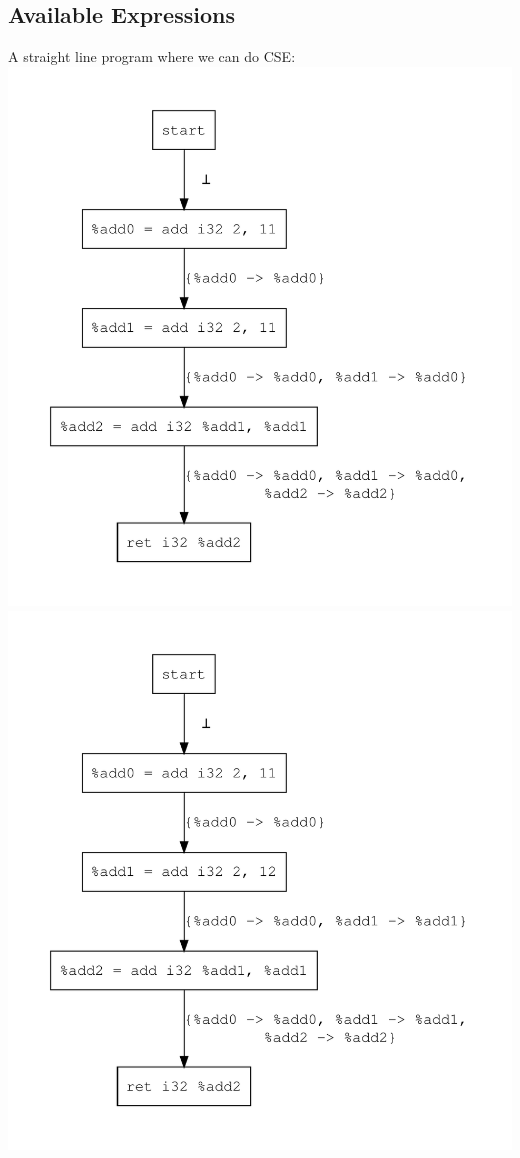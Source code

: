\documentclass{article}
\theoremstyle{definition}
\begin{document}
\subsection{Available Expressions}
A straight line program where we can do CSE:
\includegraphics[scale=.4]{figures/cse/straight-line/can-do.pdf}
\includegraphics[scale=.4]{figures/cse/straight-line/no-do.pdf}
\end{document}
